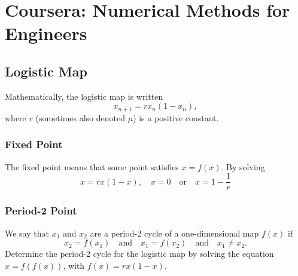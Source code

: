 \chapter{Coursera: Numerical Methods for Engineers}

\section{Logistic Map}

Mathematically, the logistic map is written
\begin{equation}
    \label{eq:logistic_map}
    x_{n+1} = r x_n (1 - x_n),
\end{equation}
where $r$ (sometimes also denoted $\mu$) is a positive constant.

\subsection{Fixed Point}
The fixed point means that some point satisfies $x = f(x)$. By solving 
\begin{equation*}
    x = rx(1-x), \quad x = 0 \quad \text{or}\quad  x = 1 - \frac{1}{r}
\end{equation*}


\subsection{Period-2 Point}
We say that $x_1$ and $x_2$ are a period-2 cycle of a one-dimensional map $f(x)$ if
\begin{equation*}
x_2 = f(x_1) \quad\textrm{and}\quad  x_1 = f(x_2) \quad\textrm{and}\quad x_1 \ne x_2 . 
\end{equation*}
Determine the period-2 cycle for the logistic map by solving the equation $x = f(f(x))$,
with $f(x) = rx(1-x)$.